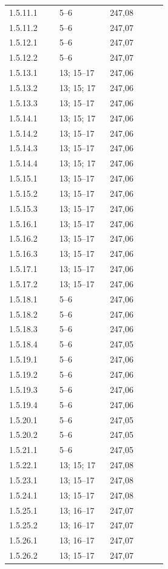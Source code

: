 \documentclass[11pt]{article}
\begin{document}
\begin{longtable}{@{}p{0.29\linewidth}p{0.29\linewidth}p{0.32\linewidth}@{}}
1.5.11.1 & 5--6 & 247,08 \\
1.5.11.2 & 5--6 & 247,07 \\
1.5.12.1 & 5--6 & 247,07 \\
1.5.12.2 & 5--6 & 247,07 \\
1.5.13.1 & 13; 15--17 & 247,06 \\
1.5.13.2 & 13; 15; 17 & 247,06 \\
1.5.13.3 & 13; 15--17 & 247,06 \\
1.5.14.1 & 13; 15; 17 & 247,06 \\
1.5.14.2 & 13; 15--17 & 247,06 \\
1.5.14.3 & 13; 15--17 & 247,06 \\
1.5.14.4 & 13; 15; 17 & 247,06 \\
1.5.15.1 & 13; 15--17 & 247,06 \\
1.5.15.2 & 13; 15--17 & 247,06 \\
1.5.15.3 & 13; 15--17 & 247,06 \\
1.5.16.1 & 13; 15--17 & 247,06 \\
1.5.16.2 & 13; 15--17 & 247,06 \\
1.5.16.3 & 13; 15--17 & 247,06 \\
1.5.17.1 & 13; 15--17 & 247,06 \\
1.5.17.2 & 13; 15--17 & 247,06 \\
1.5.18.1 & 5--6 & 247,06 \\
1.5.18.2 & 5--6 & 247,06 \\
1.5.18.3 & 5--6 & 247,06 \\
1.5.18.4 & 5--6 & 247,05 \\
1.5.19.1 & 5--6 & 247,06 \\
1.5.19.2 & 5--6 & 247,06 \\
1.5.19.3 & 5--6 & 247,06 \\
1.5.19.4 & 5--6 & 247,06 \\
1.5.20.1 & 5--6 & 247,05 \\
1.5.20.2 & 5--6 & 247,05 \\
1.5.21.1 & 5--6 & 247,05 \\
1.5.22.1 & 13; 15; 17 & 247,08 \\
1.5.23.1 & 13; 15--17 & 247,08 \\
1.5.24.1 & 13; 15--17 & 247,08 \\
1.5.25.1 & 13; 16--17 & 247,07 \\
1.5.25.2 & 13; 16--17 & 247,07 \\
1.5.26.1 & 13; 16--17 & 247,07 \\
1.5.26.2 & 13; 15--17 & 247,07 \\

\end{longtable}
\end{document}
